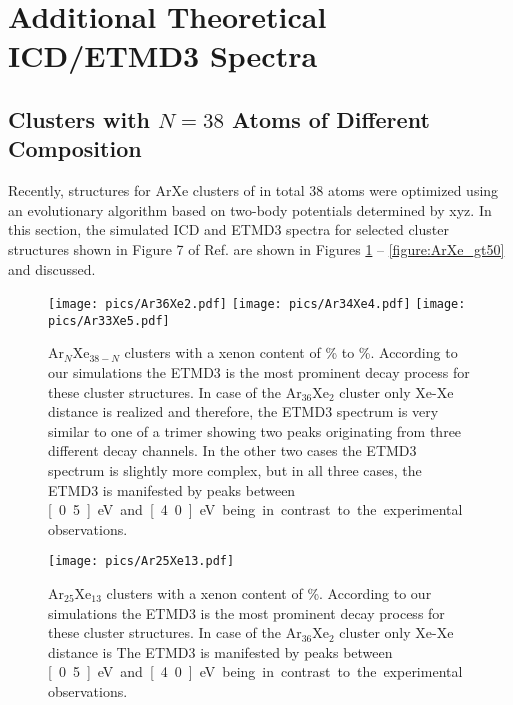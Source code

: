 \section{Additional Theoretical ICD/ETMD3 Spectra}

\subsection{Clusters with $N=38$ Atoms of Different Composition}
Recently, structures for ArXe clusters of in total 38 atoms were optimized
using an evolutionary algorithm based on two-body potentials determined
by xyz. \cite{marques}
In this section, the simulated ICD and ETMD3 spectra for selected cluster
structures shown in Figure 7 of Ref.  are shown in Figures
\ref{figure:ArXe_lt15} -- \ref{figure:ArXe_gt50} and discussed.


\begin{figure}
 \centering
 \texttt{[image: pics/Ar36Xe2.pdf]}
 \texttt{[image: pics/Ar34Xe4.pdf]}
 \texttt{[image: pics/Ar33Xe5.pdf]}
 \caption{Ar$_N$Xe$_{38-N}$ clusters with a xenon content of
          \unit[5]{\%} to \unit[13]{\%}.
          According to our simulations the ETMD3 is the most prominent decay
          process for these cluster structures.
          In case of the Ar$_{36}$Xe$_2$ cluster only Xe-Xe distance is
          realized and therefore, the ETMD3 spectrum is very similar
          to one of a trimer
          showing two peaks originating
          from three different decay channels. In the other two cases the ETMD3
          spectrum is slightly more complex, but in all three cases, the ETMD3
          is manifested by peaks between \unit[0.5]{eV} and \unit[4.0]{eV} being
          in contrast to the experimental observations.}
 \label{figure:ArXe_lt15}
\end{figure}

\begin{figure}
 \centering
 \texttt{[image: pics/Ar25Xe13.pdf]}
 \caption{Ar$_25$Xe$_{13}$ clusters with a xenon content of
          \unit[34]{\%}.
          According to our simulations the ETMD3 is the most prominent decay
          process for these cluster structures.
          In case of the Ar$_{36}$Xe$_2$ cluster only Xe-Xe distance is
          The ETMD3 is manifested by peaks between \unit[0.5]{eV}
          and \unit[4.0]{eV} being
          in contrast to the experimental observations.}
 \label{}
\end{figure}

